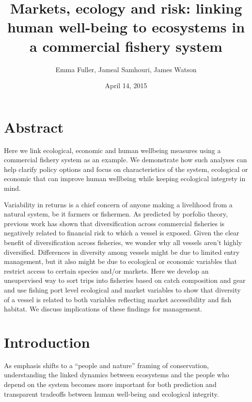 \documentclass[]{article}
\title{Markets, ecology and risk: linking human well-being to ecosystems in a
commercial fishery system}
\author{Emma Fuller, Jameal Samhouri, James Watson}
\date{April 14, 2015}
\begin{document}
\maketitle


\section{Abstract}\label{abstract}

Here we link ecological, economic and human wellbeing measures using a
commercial fishery system as an example. We demonstrate how such
analyses can help clarify policy options and focus on characteristics of
the system, ecological or economic that can improve human wellbeing
while keeping ecological integrety in mind.

Variability in returns is a chief concern of anyone making a livelihood
from a natural system, be it farmers or fishermen. As predicted by
porfolio theory, previous work has shown that diversification across
commercial fisheries is negatively related to financial risk to which a
vessel is exposed. Given the clear benefit of diversification across
fisheries, we wonder why all vessels aren't highly diversified.
Differences in diversity among vessels might be due to limited entry
management, but it also might be due to ecological or economic variables
that restrict access to certain species and/or markets. Here we develop
an unsupervised way to sort trips into fisheries based on catch
composition and gear and use fishing port level ecological and market
variables to show that diversity of a vessel is related to both
variables reflecting market accessibility and fish habitat. We discuss
implications of these findings for management.

\section{Introduction}\label{introduction}

As emphasis shifts to a ``people and nature'' framing of conservation,
understanding the linked dynamics between ecosystems and the people who
depend on the system becomes more important for both prediction and
transparent tradeoffs between human well-being and ecological integrity.
\end{document}
